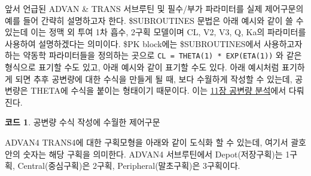 \documentclass[
  11pt,
  krantz2, a4paper, twoside]{krantz}
\newenvironment{Shaded}{\begin{snugshade}}{\end{snugshade}}
\newcommand{\DataTypeTok}[1]{\textcolor[rgb]{0.13,0.29,0.53}{#1}}
\newcommand{\DecValTok}[1]{\textcolor[rgb]{0.00,0.00,0.81}{#1}}
\newcommand{\KeywordTok}[1]{\textcolor[rgb]{0.13,0.29,0.53}{\textbf{#1}}}
\newcommand{\NormalTok}[1]{#1}
\theoremstyle{definition}
\theoremstyle{definition}
\newtheorem{example}{코드}[chapter]
\theoremstyle{definition}
\theoremstyle{remark}
\begin{document}
앞서 언급된 ADVAN \& TRANS 서브루틴 및 필수/부가 파라미터를 실제 제어구문의 예를 들어 간략히 설명하고자 한다. \$SUBROUTINES 문법은 아래 예시와 같이 쓸 수 있는데 이는 정맥 외 투여 1차 흡수, 2구획 모델이며 CL, V2, V3, Q, Ka의 파라미터를 사용하여 설명하겠다는 의미이다. \$PK block에는 \$SUBROUTINES에서 사용하고자 하는 약동학 파라미터들을 정의하는 곳으로 \texttt{CL\ =\ THETA(1)\ *\ EXP(ETA(1))} 와 같은 형식으로 표기할 수도 있고, 아래 예시와 같이 표기할 수도 있다. 아래 예시처럼 표기하게 되면 추후 공변량에 대한 수식을 만들게 될 때, 보다 수월하게 작성할 수 있는데, 공변량은 THETA에 수식을 붙이는 형태이기 때문이다. 이는 \protect\hyperlink{covariate-analysis}{11장 공변량 분석}에서 다뤄진다.

\begin{example}
\protect\hypertarget{exm:code-example-advan4}{}{\label{exm:code-example-advan4} }공변량 수식 작성에 수월한 제어구문
\end{example}
\vspace{-5ex}

\begin{Shaded}
\end{Shaded}

ADVAN4 TRANS4에 대한 구획모형을 아래와 같이 도식화 할 수 있는데, 여기서 괄호 안의 숫자는 해당 구획을 의미한다.
ADVAN4 서브루틴에서 Depot(저장구획)는 1구획, Central(중심구획)은 2구획, Peripheral(말초구획)은
3구획이다.
\end{document}

